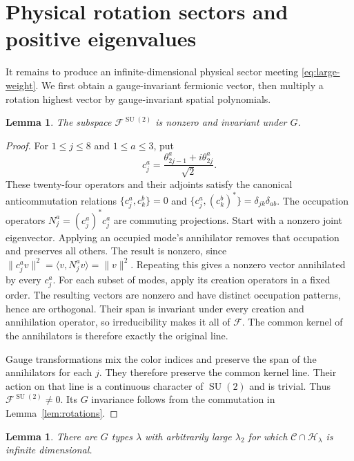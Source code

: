 \documentclass[11pt]{amsart}
\newcommand{\F}{\mathcal F}
\newcommand{\Core}{\mathcal C}
\newcommand{\Hphys}{\mathcal H}
\newcommand{\SU}{\operatorname{SU}}
\newcommand{\norm}[1]{\lVert #1\rVert}
\newcommand{\ip}[2]{\langle #1,#2\rangle}
\newtheorem{lemma}[theorem]{Lemma}
\theoremstyle{remark}
\numberwithin{equation}{section}
\begin{document}
\section{Physical rotation sectors and positive eigenvalues}
\label{sec:sectors}

It remains to produce an infinite-dimensional physical sector meeting
\eqref{eq:large-weight}. We first obtain a gauge-invariant fermionic
vector, then multiply a rotation highest vector by gauge-invariant
spatial polynomials.

\begin{lemma}
\label{lem:fermion-invariant}
The subspace $\F^{\SU(2)}$ is nonzero and invariant under $G$.
\end{lemma}

\begin{proof}
For $1\leq j\leq8$ and $1\leq a\leq3$, put
\[
 c_j^a=\frac{\theta_{2j-1}^a+i\theta_{2j}^a}{\sqrt2}.
\]
These twenty-four operators and their adjoints satisfy the canonical
anticommutation relations
$\{c_j^a,c_k^b\}=0$ and
$\{c_j^a,(c_k^b)^*\}=\delta_{jk}\delta_{ab}$.
The occupation operators $N_j^a=(c_j^a)^*c_j^a$ are commuting
projections. Start with a nonzero joint eigenvector. Applying an
occupied mode's annihilator removes that occupation and preserves all
others. The result is nonzero, since
$\norm{c_j^a v}^2=\ip{v}{N_j^a v}=\norm{v}^2$. Repeating this gives
a nonzero vector
annihilated by every $c_j^a$. For each subset of modes, apply its
creation operators in a fixed order. The resulting vectors are
nonzero and have distinct occupation patterns, hence are orthogonal.
Their span is invariant under every creation and
annihilation operator, so irreducibility makes it all of $\F$.
The common kernel of the annihilators is therefore exactly the
original line.

Gauge transformations mix the color indices and preserve the span
of the annihilators for each $j$. They therefore preserve the common
kernel line. Their action on that line is a continuous character of
$\SU(2)$ and is trivial. Thus $\F^{\SU(2)}\ne0$. Its $G$
invariance follows from the commutation in Lemma~\ref{lem:rotations}.
\end{proof}

\begin{lemma}
\label{lem:large-sectors}
There are $G$ types $\lambda$ with arbitrarily large $\lambda_2$
for which $\Core\cap\Hphys_\lambda$ is infinite dimensional.
\end{lemma}
\end{document}

